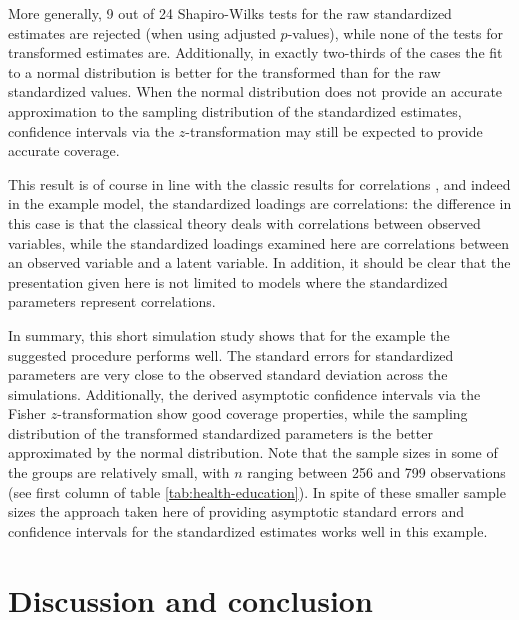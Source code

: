 \documentclass[a4paper,11pt]{article}
\newcommand{\0}{\boldsymbol{0}}
\begin{document}
More generally, 9 out of 24 Shapiro-Wilks tests for the raw standardized estimates are rejected (when using
adjusted $p$-values), while none of the tests for transformed estimates are. 
Additionally, in exactly two-thirds of the cases the fit to a normal distribution is better for the transformed than for the
raw standardized values. When the normal distribution does not provide an accurate approximation 
to the sampling distribution of the standardized estimates, confidence intervals via the $z$-transformation may
still be expected to provide accurate coverage. 

This result is of course in line with the classic results for correlations
\citep[e.g.][chapter 32]{johnson1995distributions}, and indeed in the example model, the standardized loadings
are correlations: the difference in this case is that the classical theory deals with correlations between observed variables,
while the standardized loadings examined here are correlations between an observed variable and a latent variable. 
In addition, it should be clear that the presentation given here is not limited to models where the standardized parameters
represent correlations.

In summary, this short simulation study shows that for the example the suggested procedure performs well.
The standard errors for standardized parameters  are  very close to the observed standard deviation across 
the simulations. Additionally, the derived asymptotic confidence intervals via the Fisher $z$-transformation
show good coverage properties, while the sampling distribution of the  transformed standardized parameters is 
the better approximated by the normal distribution.
Note that the sample sizes in 
some of the groups are relatively small, with $n$ ranging between 256 and 799 observations (see first column of table \ref{tab:health-education}).
In spite of these smaller sample sizes the approach taken here of providing asymptotic standard errors and confidence intervals for the 
standardized estimates works well in this example.



\section{Discussion and conclusion\label{sec:conclusion}}


\end{document}
